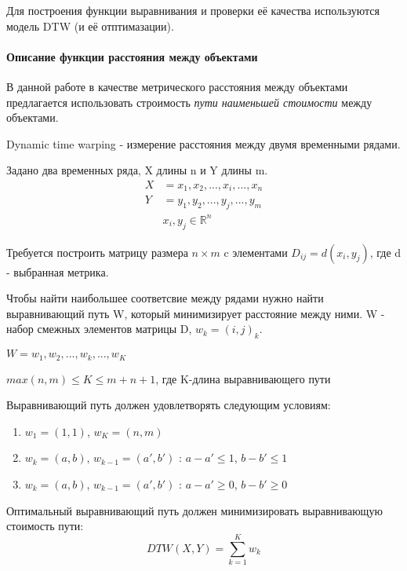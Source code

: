 \documentclass[12pt,twoside]{article}
\begin{document}
        Для построения функции выравнивания и проверки её качества используются модель DTW (и её отптимазации).
            
    \paragraph{Описание функции расстояния между объектами}

        В данной работе в качестве метрического расстояния между объектами предлагается использовать строимость
        \textit{пути наименьшей стоимости} между объектами.
            
        Dynamic time warping - измерение расстояния между двумя временными рядами.
            
        Задано два временных ряда, X длины n и Y длины m.
            \begin{align*}
                X &= x_1,x_2, ..., x_i, ..., x_n \\
                Y &= y_1,y_2, ..., y_j, ..., y_m \\
                & x_i, y_j \in \mathbb{R}^n
            \end{align*}

        Требуется построить матрицу размера $n\times m$ c элементами $D_{ij}=d(x_i, y_j)$, где d - выбранная метрика.
            
        Чтобы найти наибольшее соответсвие между рядами нужно найти выравнивающий путь W, который минимизирует расстояние между ними.
        W - набор смежных элементов матрицы D, $w_k = (i, j)_k$.
            
            $W = w_1,w_2, ..., w_k, ..., w_K $

            $max(n, m)\leq K \leq m+n+1$, где K-длина выравнивающего пути
            
        Выравнивающий путь должен удовлетворять следующим условиям:
            \begin{enumerate}
                \item $w_1=(1,1)$, $w_K=(n, m)$
                \item $w_k = (a, b)$, $w_{k-1}=(a', b')$ : $a-a' \leq 1$, $b-b' \leq 1$ 
                \item $w_k = (a, b)$, $w_{k-1}=(a', b')$ : $a-a' \geq 0$, $b-b'\geq 0$
            \end{enumerate}

        Оптимальный выравнивающий путь должен минимизировать выравнивающую стоимость пути:
            $$
                DTW(X, Y)=\displaystyle\sum\limits_{k=1}^{K} w_k
            $$
            
\end{document}
